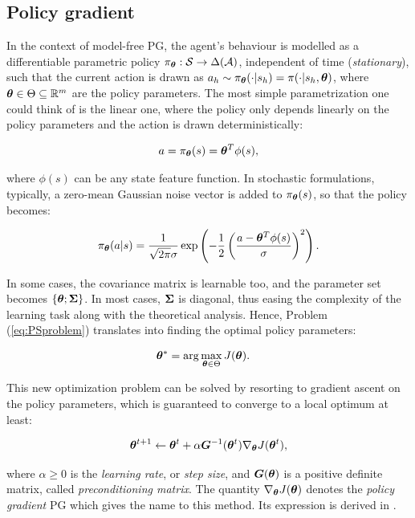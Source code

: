 \subsection{Policy gradient}
In the context of model-free \gls{PG}, the agent's behaviour is modelled as a differentiable parametric policy $\pi_{\boldsymbol{\theta}}:\mathcal{S}\to\Delta(\mathcal{A})$, independent of time (\emph{stationary}), such that the current action is drawn as $a_h\sim\pi_{\boldsymbol{\theta}}(\cdot|s_h)=\pi(\cdot|s_h, \boldsymbol{\theta})$, where $\boldsymbol{\theta}\in\Theta\subseteq\mathbb{R}^m$ are the policy parameters. The most simple parametrization one could think of is the linear one, where the policy only depends linearly on the policy parameters and the action is drawn deterministically:

\begin{align}
a = \pi_{\boldsymbol{\theta}}(s) = \boldsymbol{\theta}^T\phi(s),
\end{align}

where $\phi(s)$ can be any state feature function. In stochastic formulations, typically, a zero-mean Gaussian noise vector is added to $\pi_{\boldsymbol{\theta}}(s)$, so that the policy becomes:

\begin{align}
\pi_{\boldsymbol{\theta}}(a|s) = \frac{1}{\sqrt{2\pi}\sigma}\exp\left(-\frac{1}{2}\left(\frac{a-\boldsymbol{\theta}^T\phi(s)}{\sigma}\right)^2\right).
\end{align}

In some cases, the covariance matrix is learnable too, and the parameter set becomes $\{\boldsymbol{\theta}; \boldsymbol{\Sigma}\}$. In most cases, $\boldsymbol{\Sigma}$ is diagonal, thus easing the complexity of the learning task along with the theoretical analysis. Hence, Problem (\ref{eq:PSproblem}) translates into finding the optimal policy parameters:

\begin{align}
\boldsymbol{\theta}^* &= \arg \max_{\boldsymbol{\theta}\in\Theta}J(\boldsymbol{\theta}).
\end{align}

This new optimization problem can be solved by resorting to gradient ascent on the policy parameters, which is guaranteed to converge to a local optimum at least:

\begin{align}
\boldsymbol{\theta}^{t+1} \leftarrow \boldsymbol{\theta}^t+\alpha\boldsymbol{G}^{-1}(\boldsymbol{\theta}^t)\nabla_{\boldsymbol{\theta}}J(\boldsymbol{\theta}^t), \label{eq:paramsupdate}
\end{align}

where $\alpha\geq 0$ is the \emph{learning rate}, or \emph{step size}, and $\boldsymbol{G}(\boldsymbol{\theta})$ is a positive definite matrix, called \emph{preconditioning matrix}. The quantity $\nabla_{\boldsymbol{\theta}}J(\boldsymbol{\theta})$ denotes the \emph{policy gradient} \gls{PG} which gives the name to this method. Its expression is derived in \cite{sutton2000policy}.

